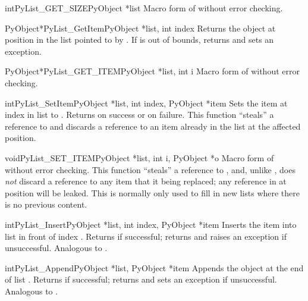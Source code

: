 \documentclass{manual}
\begin{document}
\begin{cfuncdesc}{int}{PyList_GET_SIZE}{PyObject *list}
Macro form of  without error checking.
\end{cfuncdesc}

\begin{cfuncdesc}{PyObject*}{PyList_GetItem}{PyObject *list, int index}
Returns the object at position  in the list pointed
to by .  If  is out of bounds, returns \NULL{} and
sets an  exception.
\end{cfuncdesc}

\begin{cfuncdesc}{PyObject*}{PyList_GET_ITEM}{PyObject *list, int i}
Macro form of  without error checking.
\end{cfuncdesc}

\begin{cfuncdesc}{int}{PyList_SetItem}{PyObject *list, int index,
                                       PyObject *item}
Sets the item at index  in list to .
Returns  on success or  on failure.
  This function ``steals'' a reference to  and
discards a reference to an item already in the list at the affected
position.
\end{cfuncdesc}

\begin{cfuncdesc}{void}{PyList_SET_ITEM}{PyObject *list, int i,
                                              PyObject *o}
Macro form of  without error checking.
  This function ``steals'' a reference to ,
and, unlike , does \emph{not} discard a
reference to any item that it being replaced; any reference in
 at position  will be leaked.  This is normally only
used to fill in new lists where there is no previous content.
\end{cfuncdesc}

\begin{cfuncdesc}{int}{PyList_Insert}{PyObject *list, int index,
                                      PyObject *item}
Inserts the item  into list  in front of index
.  Returns  if successful; returns  and
raises an exception if unsuccessful.  Analogous to
.
\end{cfuncdesc}

\begin{cfuncdesc}{int}{PyList_Append}{PyObject *list, PyObject *item}
Appends the object  at the end of list .  Returns
 if successful; returns  and sets an exception if
unsuccessful.  Analogous to .
\end{cfuncdesc}
\end{document}
